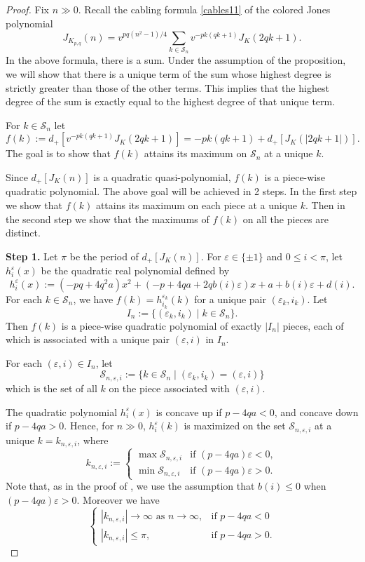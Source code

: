 \documentclass[11pt]{amsart}
\numberwithin{equation}{section}
\theoremstyle{plain}
\theoremstyle{definition}
\def\CS{\mathcal S}
\def\ve{\varepsilon}
\begin{document}
\begin{proof} Fix $n \gg 0$. Recall the cabling formula \eqref{cables11} of the colored Jones polynomial
$$J_{K_{p,q}}(n)= v^{pq(n^2-1)/4} \sum_{k \in \CS_n} v^{-pk(qk+1)} J_K(2qk+1).$$
In the above formula, there is a sum. Under the assumption of the proposition, we will show that there is a unique term of the sum whose highest degree is strictly greater than those of the other terms. This implies that the highest degree of the sum is exactly equal to the highest degree of that unique term. 

For $k \in \CS_n$ let $$f(k) := d_+ [v^{-pk(qk+1)} J_K(2qk+1)] = -pk(qk+1)+d_+[J_K(|2qk+1|)].$$
The goal is to show that $f(k)$ attains its maximum on $\CS_n$ at a unique $k$. 

Since $d_+[J_K(n)]$ is a quadratic quasi-polynomial, $f(k)$ is a piece-wise quadratic polynomial. The above goal will be achieved in 2 steps. In the first step we show that $f(k)$ attains its maximum on each piece at a unique $k$. Then in the second step we show that the maximums of $f(k)$ on all the pieces are distinct.

\textbf{Step 1.} Let $\pi$ be the period of $d_+[J_K(n)]$. For $\ve \in \{\pm 1\}$ and $0 \le i < \pi$, let $h_i^{\ve}(x)$ be the quadratic real polynomial defined by
$$
h_i^{\ve}(x) := ( -pq + 4q^2 a ) x^2 + ( -p + 4q a + 2q b(i) \ve ) x +  a + b(i) \ve + d(i).
$$
For each $k \in \CS_n$, we have $f(k)= h^{\ve_k}_{i_k}(k)$
for a unique pair $(\ve_k, i_{k})$. Let
$$I_n := \{ (\ve_k,i_{k}) \mid k \in \CS_n\}.$$
Then $f(k)$ is a piece-wise quadratic polynomial of exactly $|I_n|$ pieces, each of which is associated with a unique pair $(\ve, i)$ in $I_n$.

For each $(\ve,i) \in I_n$, let $$\CS_{n,\ve,i} := \{ k \in \CS_n \mid (\ve_k, i_k) = (\ve,i)\}$$
which is the set of all $k$ on the piece associated with $(\ve,i)$. 

The quadratic polynomial $h_i^{\ve}(x)$ is concave up if $p-4qa<0$, and concave down if $p-4qa>0$.  Hence, for $n \gg 0$, $h_i^{\ve}(k)$ is maximized on the set $\CS_{n,\ve,i}$ at a unique $k=k_{n,\ve,i}$, where
$$ k_{n,\ve,i} := \begin{cases} \max \CS_{n,\ve,i} &\mbox{if } (p - 4qa)\ve < 0, \\
\min \CS_{n,\ve,i} &\mbox{if } (p - 4qa)\ve > 0.  \end{cases}$$
Note that, as in the proof of \cite[Proposition 3.2]{Effie-Anh-slope}, we use the assumption that $b(i) \le 0$ when $(p - 4qa)\ve > 0$. Moreover we have 
$$ \begin{cases}  |k_{n,\ve,i}|  \to \infty \mbox{ as }  n \to \infty, &\mbox{if } p - 4qa < 0 \\
 |k_{n,\ve,i}|  \le \pi, &\mbox{if } p - 4qa > 0.  \end{cases}$$


\end{proof}
\end{document}

